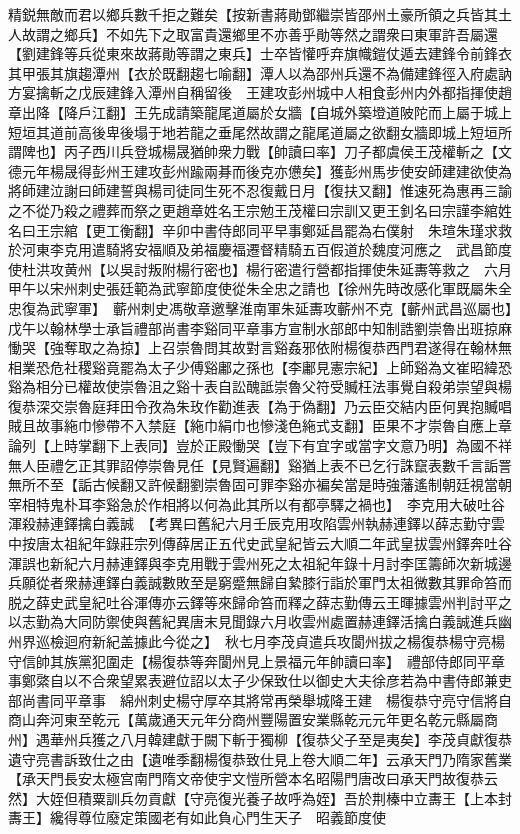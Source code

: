 精鋭無敵而君以鄉兵數千拒之難矣【按新書蔣勛鄧繼崇皆邵州土豪所領之兵皆其土人故謂之鄉兵】不如先下之取富貴還鄉里不亦善乎勛等然之謂衆曰東軍許吾屬還【劉建鋒等兵從東來故蔣勛等謂之東兵】士卒皆懽呼弃旗幟鎧仗遁去建鋒令前鋒衣其甲張其旗趨潭州【衣於既翻趨七喻翻】潭人以為邵州兵還不為備建鋒徑入府處訥方宴擒斬之戊辰建鋒入潭州自稱留後　王建攻彭州城中人相食彭州内外都指揮使趙章出降【降戶江翻】王先成請築龍尾道屬於女牆【自城外築墱道陂陀而上屬于城上短垣其道前高後卑後塌于地若龍之垂尾然故謂之龍尾道屬之欲翻女牆即城上短垣所謂陴也】丙子西川兵登城楊晟猶帥衆力戰【帥讀曰率】刀子都虞侯王茂權斬之【文德元年楊晟得彭州王建攻彭州踰兩朞而後克亦憊矣】獲彭州馬步使安師建建欲使為將師建泣謝曰師建誓與楊司徒同生死不忍復戴日月【復扶又翻】惟速死為惠再三諭之不從乃殺之禮葬而祭之更趙章姓名王宗勉王茂權曰宗訓又更王釗名曰宗謹李綰姓名曰王宗綰【更工衡翻】辛卯中書侍郎同平早事鄭延昌罷為右僕射　朱瑄朱瑾求救於河東李克用遣騎將安福順及弟福慶福遷督精騎五百假道於魏度河應之　武昌節度使杜洪攻黄州【以吳討叛附楊行密也】楊行密遣行營都指揮使朱延夀等救之　六月甲午以宋州刺史張廷範為武寧節度使從朱全忠之請也【徐州先時改感化軍既屬朱全忠復為武寧軍】　蘄州刺史馮敬章邀擊淮南軍朱延夀攻蘄州不克【蘄州武昌巡屬也】　戊午以翰林學士承旨禮部尚書李谿同平章事方宣制水部郎中知制誥劉崇魯出班掠麻慟哭【強奪取之為掠】上召崇魯問其故對言谿姦邪依附楊復恭西門君遂得在翰林無相業恐危社稷谿竟罷為太子少傅谿鄘之孫也【李鄘見憲宗紀】上師谿為文崔昭緯恐谿為相分已權故使崇魯沮之谿十表自訟醜詆崇魯父符受贓枉法事覺自殺弟崇望與楊復恭深交崇魯庭拜田令孜為朱玫作勸進表【為于偽翻】乃云臣交結内臣何異抱贓唱賊且故事絁巾慘帶不入禁庭【絁巾絹巾也慘淺色絁式支翻】臣果不才崇魯自應上章論列【上時掌翻下上表同】豈於正殿慟哭【豈下有宜字或當字文意乃明】為國不祥無人臣禮乞正其罪詔停崇魯見任【見賢遍翻】谿猶上表不已乞行誅竄表數千言詬詈無所不至【詬古候翻又許候翻劉崇魯固可罪李谿亦褊矣當是時強藩遙制朝廷視當朝宰相特鬼朴耳李谿急於作相將以何為此其所以有都亭驛之禍也】　李克用大破吐谷渾殺赫連鐸擒白義誠　【考異曰舊紀六月壬辰克用攻陷雲州執赫連鐸以薛志勤守雲中按唐太祖紀年錄莊宗列傳薛居正五代史武皇紀皆云大順二年武皇拔雲州鐸奔吐谷渾誤也新紀六月赫連鐸與李克用戰于雲州死之太祖紀年錄十月討李匡籌師次新城邊兵願從者衆赫連鐸白義誠數敗至是窮蹙無歸自縶膝行詣於軍門太祖微數其罪命笞而脱之薛史武皇紀吐谷渾傳亦云鐸等來歸命笞而釋之薛志勤傳云王暉據雲州判討平之以志勤為大同防禦使與舊紀異唐末見聞錄六月收雲州處置赫連鐸活擒白義誠進兵幽州界巡檢迴府新紀盖據此今從之】　秋七月李茂貞遣兵攻閬州拔之楊復恭楊守亮楊守信帥其族黨犯圍走【楊復恭等奔閬州見上景福元年帥讀曰率】　禮部侍郎同平章事鄭綮自以不合衆望累表避位詔以太子少保致仕以御史大夫徐彦若為中書侍郎兼吏部尚書同平章事　綿州刺史楊守厚卒其將常再榮舉城降王建　楊復恭守亮守信將自商山奔河東至乾元【萬歲通天元年分商州豐陽置安業縣乾元元年更名乾元縣屬商州】遇華州兵獲之八月韓建獻于闕下斬于獨柳【復恭父子至是夷矣】李茂貞獻復恭遺守亮書訴致仕之由【遺唯季翻楊復恭致仕見上卷大順二年】云承天門乃隋家舊業【承天門長安太極宫南門隋文帝使宇文愷所營本名昭陽門唐改曰承天門故復恭云然】大姪但積粟訓兵勿貢獻【守亮復光養子故呼為姪】吾於荆榛中立夀王【上本封夀王】纔得尊位廢定策國老有如此負心門生天子　昭義節度使